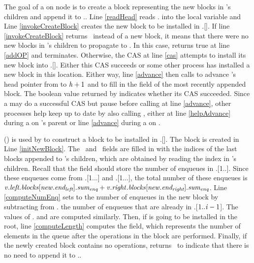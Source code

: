 The goal of a  on node  is to create a block representing the new blocks
in 's
children and append it to .. 
Line \ref{readHead} reads . into the local variable 
and Line \ref{invokeCreateBlock} creates the new block to be installed in .[].
If line \ref{invokeCreateBlock} returns \nl\ instead of a new block, it means that there were no new blocks in 's children to propagate to .
In this case,  returns true at line \ref{addOP} and terminates.
Otherwise, the CAS at line \ref{cas} attempts to install its new block into .[].
Either this CAS succeeds or some other process has installed a new block in this location.
Either way, line \ref{advance} then calls  to advance 's head pointer 
from  to $\mbox{\textnormal{\textit{h}}}+1$
and to fill in the  field of the most recently appended block.
The boolean value returned by  indicates whether its CAS succeeded.
Since a  may do a successful CAS but pause before calling  at line \ref{advance},
other processes help keep  up to date by also calling , 
either at line \ref{helpAdvance} during a  on 's parent or line \ref{advance} during a  on .

() is used
by  to construct a block to be installed in .[].
The block  is created in Line \ref{initNewBlock}. 
The \eleft\ and \eright\ fields are filled in with the indices of the last blocks appended to 's
children, which are obtained by reading the  index in 's children.
Recall that the  field should store the number of enqueues in
.[1..].
Since these enqueues come from .[1...\eleft] and .[1...\eright],
the total number of these enqueues is $\mbox{\textnormal{\textit{v}}}.\mbox{\textit{left.blocks}}[\mbox{\textnormal{\textit{new}}}.\mbox{\textit{end\textsubscript{left}}}].\mbox{\textit{sum\textsubscript{enq}}} + \mbox{\textnormal{\textit{v}}}.\mbox{\textit{right}}.\mbox{\textit{blocks}}[\mbox{\textnormal{\textit{new}}}.\mbox{\textit{end\textsubscript{right}}}].\mbox{\textit{sum\textsubscript{enq}}}$.
Line \ref{computeNumEnq} sets  to the number of enqueues in the new block by
subtracting from . the number of enqueues that are already in .[$1..\mbox{\textnormal{\textit{i}}}-1$].
The values of . and  are computed similarly.
Then, if 
is going to be installed in the root, line \ref{computeLength} computes the  field, which
represents the number of elements in the queue after the operations in the block are performed.
Finally, if the newly created block contains no operations,  returns \nl\ to indicate
that there is no need to append it to ..

